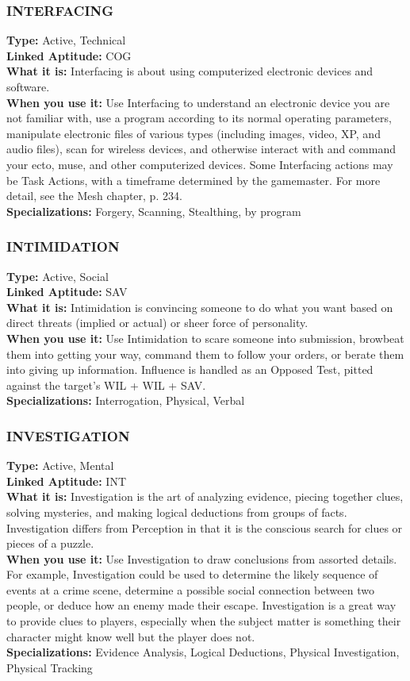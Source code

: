 \subsubsection{INTERFACING}
\textbf{Type:} Active, Technical
\\ \textbf{Linked Aptitude:} COG
\\ \textbf{What it is:} Interfacing is about using computerized
electronic devices and software.
\\ \textbf{When you use it:} Use Interfacing to understand an
electronic device you are not familiar with, use a program according to its normal operating parameters,
manipulate electronic files of various types (including
images, video, XP, and audio files), scan for wireless
devices, and otherwise interact with and command
your ecto, muse, and other computerized devices.
Some Interfacing actions may be Task Actions, with
a timeframe determined by the gamemaster. For more
detail, see the Mesh chapter, p. 234.
\\ \textbf{Specializations:} Forgery, Scanning, Stealthing, by
program

\subsubsection{INTIMIDATION}
\textbf{Type:} Active, Social
\\ \textbf{Linked Aptitude:} SAV
\\ \textbf{What it is:} Intimidation is convincing someone to
do what you want based on direct threats (implied or
actual) or sheer force of personality.
\\ \textbf{When you use it:} Use Intimidation to scare someone
into submission, browbeat them into getting your way,
command them to follow your orders, or berate them
into giving up information. Influence is handled as an
Opposed Test, pitted against the target’s WIL + WIL
+ SAV.
\\ \textbf{Specializations:} Interrogation, Physical, Verbal

\subsubsection{INVESTIGATION}
\textbf{Type:} Active, Mental
\\ \textbf{Linked Aptitude:} INT
\\ \textbf{What it is:} Investigation is the art of analyzing
evidence, piecing together clues, solving mysteries,
and making logical deductions from groups of facts.
Investigation differs from Perception in that it is the
conscious search for clues or pieces of a puzzle.
\\ \textbf{When you use it:} Use Investigation to draw conclusions from assorted details. For example, Investigation could be used to determine the likely sequence
of events at a crime scene, determine a possible social
connection between two people, or deduce how an
enemy made their escape. Investigation is a great way
to provide clues to players, especially when the subject
matter is something their character might know well
but the player does not.
\\ \textbf{Specializations:} Evidence Analysis, Logical Deductions,
Physical Investigation, Physical Tracking

